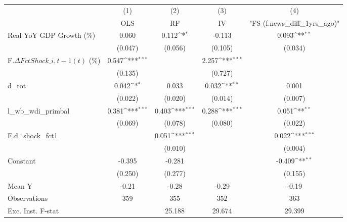 {
\def\sym#1{\ifmmode^{#1}\else\(^{#1}\)\fi}
\begin{tabular}{l*{4}{c}}
\toprule
                    &\multicolumn{1}{c}{(1)}&\multicolumn{1}{c}{(2)}&\multicolumn{1}{c}{(3)}&\multicolumn{1}{c}{(4)}\\
                    &\multicolumn{1}{c}{OLS}&\multicolumn{1}{c}{RF}&\multicolumn{1}{c}{IV}&\multicolumn{1}{c}{ "FS (f.news\_diff\_1yrs\_ago)" }\\
\midrule
Real YoY GDP Growth (\%)&       0.060         &       0.112\sym{*}  &      -0.113         &       0.093\sym{**} \\
                    &     (0.047)         &     (0.056)         &     (0.105)         &     (0.034)         \\
\addlinespace
F.$\Delta FctShock\_{i,t-1}(t)$ (\%)&       0.547\sym{***}&                     &       2.257\sym{***}&                     \\
                    &     (0.135)         &                     &     (0.727)         &                     \\
\addlinespace
d\_tot               &       0.042\sym{*}  &       0.033         &       0.032\sym{**} &       0.001         \\
                    &     (0.022)         &     (0.020)         &     (0.014)         &     (0.007)         \\
\addlinespace
l\_wb\_wdi\_primbal    &       0.381\sym{***}&       0.403\sym{***}&       0.288\sym{***}&       0.051\sym{**} \\
                    &     (0.069)         &     (0.078)         &     (0.080)         &     (0.022)         \\
\addlinespace
F.d\_shock\_fct1      &                     &       0.051\sym{***}&                     &       0.022\sym{***}\\
                    &                     &     (0.010)         &                     &     (0.004)         \\
\addlinespace
Constant            &      -0.395         &      -0.281         &                     &      -0.409\sym{**} \\
                    &     (0.250)         &     (0.277)         &                     &     (0.155)         \\
\midrule
Mean Y              &       -0.21         &       -0.28         &       -0.29         &       -0.19         \\
Observations        &         359         &         355         &         352         &         363         \\
Exc. Inst. F-stat   &                     &      25.188         &      29.674         &      29.399         \\
\bottomrule
\end{tabular}
}
